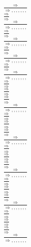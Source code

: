 \documentclass[11pt]{article}
\begin{document}
\begin{center}
\bigskip
\\$\frac{\Rightarrow }{\Rightarrow , , , , , , , }$
\bigskip
\\$\frac{\Rightarrow }{\Rightarrow }$
\bigskip
\\$\frac{\Rightarrow }{\Rightarrow , , , , , , , }$
\bigskip
\\$\frac{\Rightarrow }{\Rightarrow }$
\bigskip
\\$\frac{\Rightarrow }{\Rightarrow , , , , , , , }$
\bigskip
\\$\frac{\Rightarrow }{\Rightarrow }$
\bigskip
\\$\frac{\Rightarrow }{\Rightarrow , , , , , , , }$
\bigskip
\\$\frac{\Rightarrow }{\Rightarrow }$
\bigskip
\\$\frac{\Rightarrow }{\Rightarrow , , , , , , , }$
\bigskip
\\$\frac{\Rightarrow }{\Rightarrow }$
\bigskip
\\$\frac{\Rightarrow }{\Rightarrow }$
\bigskip
\\$\frac{\Rightarrow }{\Rightarrow }$
\bigskip
\\$\frac{\Rightarrow }{\Rightarrow , , , , , , , }$
\bigskip
\\$\frac{\Rightarrow }{\Rightarrow }$
\bigskip
\\$\frac{\Rightarrow }{\Rightarrow }$
\bigskip
\\$\frac{\Rightarrow }{\Rightarrow }$
\bigskip
\\$\frac{\Rightarrow }{\Rightarrow , , , , , , , }$
\bigskip
\\$\frac{\Rightarrow }{\Rightarrow }$
\bigskip
\\$\frac{\Rightarrow }{\Rightarrow }$
\bigskip
\\$\frac{\Rightarrow }{\Rightarrow }$
\bigskip
\\$\frac{\Rightarrow }{\Rightarrow , , , , , , , }$
\bigskip
\\$\frac{\Rightarrow }{\Rightarrow }$
\bigskip
\\$\frac{\Rightarrow }{\Rightarrow }$
\bigskip
\\$\frac{\Rightarrow }{\Rightarrow }$
\bigskip
\\$\frac{\Rightarrow }{\Rightarrow , , , , , , , }$
\bigskip
\\$\frac{\Rightarrow }{\Rightarrow }$
\bigskip
\\$\frac{\Rightarrow }{\Rightarrow }$
\bigskip
\\$\frac{\Rightarrow }{\Rightarrow }$
\bigskip
\\$\frac{\Rightarrow }{\Rightarrow , , , , , , , }$

\end{center}
\end{document}
